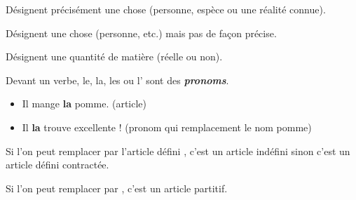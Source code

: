 \documentclass[10pt, french]{article}
\begin{document}
\begin{multicols*}{2}
\begin{definitionNOHFILLsub}
Désignent précisément une chose (personne, espèce ou une réalité connue).
\end{definitionNOHFILLsub}

\begin{definitionNOHFILLsub}
Désignent une chose (personne, etc.) mais pas de façon précise.
\end{definitionNOHFILLsub}

\begin{definitionNOHFILLsub}
Désignent une quantité de matière (réelle ou non).
\end{definitionNOHFILLsub}

\begin{astuces}
Devant un verbe, le, la, les ou l' sont des \textbf{\textit{pronoms}}.
\begin{itemize}
	\item	Il mange \textbf{la} pomme. (article)
	\item	Il \textbf{la} trouve excellente ! (pronom qui remplacement le nom pomme)
\end{itemize}
\end{astuces}

\begin{astuces}
Si l'on peut remplacer  par l'article défini , c'est un article indéfini sinon c'est un article défini contractée.
\end{astuces}

\begin{astuces}
Si l'on peut remplacer  par , c'est un article partitif.
\end{astuces}


\columnbreak

\end{multicols*}
\end{document}
